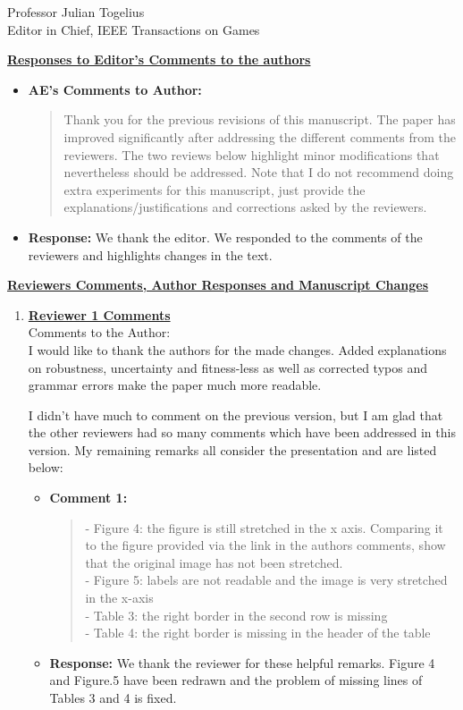 \documentclass[10pt]{letter} %
\begin{document}
\begin{letter}{Professor Julian Togelius \\ Editor in Chief, IEEE Transactions on Games}
\newpage


{\bf \underline{ Responses to Editor's  Comments to the authors}}\\
\begin{itemize}
 \item 	\bf  {\bf AE's Comments to Author:} 
		\begin{quote}	
Thank you for the previous revisions of this manuscript. The paper has improved significantly after addressing the different comments from the reviewers. The two reviews below highlight minor modifications that nevertheless should be addressed. Note that I do not recommend doing extra experiments for this manuscript, just provide the explanations/justifications and corrections asked by the reviewers.
		\end{quote}	
 \item {\bf Response:} 
We thank the editor. We responded to the comments of the reviewers and highlights changes in the text. 
\end{itemize}
\newpage
{\bf
\underline{
 Reviewers Comments, Author Responses and Manuscript Changes}}
\begin{enumerate}

\item {\bf \underline{ Reviewer 1 Comments}}\\
		Comments to the Author:\\
	I would like to thank the authors for the made changes. Added explanations on robustness, uncertainty and fitness-less as well as corrected typos and grammar errors make the paper much more readable.
	
	I didn't have much to comment on the previous version, but I am glad that the other reviewers had so many comments which have been addressed in this version. My remaining remarks all consider the presentation and are listed below:
\begin{itemize}
	\item {\bf Comment 1:}
	\begin{quote}	
	- Figure 4: the figure is still stretched in the x axis. Comparing it to the figure provided via the link in the authors comments, show that the original image has not been stretched.\\
	- Figure 5: labels are not readable and the image is very stretched in the x-axis\\
	- Table 3: the right border in the second row is missing\\
	- Table 4: the right border is missing in the header of the table
	\end{quote}	
	\item {\bf Response:} 
		We thank the reviewer for these helpful remarks. Figure 4 and Figure.5 have been redrawn and the problem of missing lines of Tables 3 and 4 is fixed.
\end{itemize}


\end{enumerate}
\end{letter}
\end{document}
